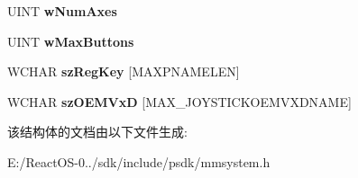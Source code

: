 \begin{DoxyCompactItemize}
U\+I\+NT {\bfseries w\+Num\+Axes}
\item 
\mbox{\label{structtag_j_o_y_c_a_p_s_w_a57bbf784f57a348dae144dfc0268bd8f}} 
U\+I\+NT {\bfseries w\+Max\+Buttons}
\item 
\mbox{\label{structtag_j_o_y_c_a_p_s_w_aad1a8d8d3c63c4905b718c7a12375360}} 
W\+C\+H\+AR {\bfseries sz\+Reg\+Key} \mbox{[}M\+A\+X\+P\+N\+A\+M\+E\+L\+EN\mbox{]}
\item 
\mbox{\label{structtag_j_o_y_c_a_p_s_w_a266387268808d7e5b25e285b6fb43f91}} 
W\+C\+H\+AR {\bfseries sz\+O\+E\+M\+VxD} \mbox{[}M\+A\+X\+\_\+\+J\+O\+Y\+S\+T\+I\+C\+K\+O\+E\+M\+V\+X\+D\+N\+A\+ME\mbox{]}
\end{DoxyCompactItemize}


该结构体的文档由以下文件生成\+:\begin{DoxyCompactItemize}
\item 
E\+:/\+React\+O\+S-\/0../sdk/include/psdk/mmsystem.\+h\end{DoxyCompactItemize}
